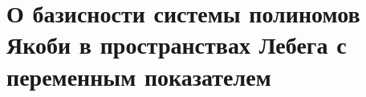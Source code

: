 %
%
%
%
%
%
%




\section{О базисности системы полиномов Якоби в пространствах Лебега с переменным показателем}

